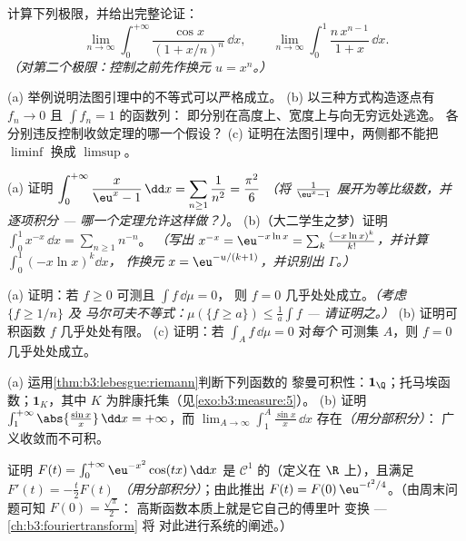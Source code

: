 \begin{exercise}[$\star$]\label{exo:b3:lebesgue:2}
计算下列极限，并给出完整论证：
\[
\lim_{n\to\infty}\int_0^{+\infty}
\frac{\cos x}{(1 + x/n)^{n}}\,\dd x,
\qquad
\lim_{n\to\infty}\int_0^1 \frac{n\,x^{n-1}}{1 + x}\,\dd x .
\]
\emph{（对第二个极限：控制之前先作换元 $u = x^n$。）}
\end{exercise}

\begin{exercise}[$\star\star$]\label{exo:b3:lebesgue:3}
(a) 举例说明法图引理中的不等式可以严格成立。
(b) 以三种方式构造逐点有 $f_n \to 0$ 且 $\int f_n = 1$ 的函数列：
即分别在高度上、宽度上与向无穷远处逃逸。
各分别违反控制收敛定理的哪一个假设？
(c) 证明在法图引理中，两侧都不能把 $\liminf$ 换成
$\limsup$。
\end{exercise}

\begin{exercise}[$\star\star$]\label{exo:b3:lebesgue:4}
(a) 证明 $\displaystyle\int_0^{+\infty}\frac{x}{\eu^x -
1}\,\dd x = \sum_{n\geq1}\frac1{n^2} = \frac{\pi^2}6$
\emph{（将 $\frac1{\eu^x - 1}$ 展开为等比级数，并
逐项积分 --- 哪一个定理允许这样做？）}。
(b)（大二学生之梦）证明
$\displaystyle\int_0^1 x^{-x}\,\dd x = \sum_{n\geq1}n^{-n}$。
\emph{（写出 $x^{-x} = \eu^{-x\ln x} = \sum_k\frac{(-x\ln
x)^k}{k!}$，并计算 $\int_0^1(-x\ln x)^k\dd x$，
作换元 $x = \eu^{-u/(k+1)}$，并识别出 $\Gamma$。）}
\end{exercise}

\begin{exercise}[$\star\star$]\label{exo:b3:lebesgue:5}
(a) 证明：若 $f \geq 0$ 可测且 $\int f\,\dd\mu = 0$，
则 $f = 0$ 几乎处处成立。\emph{（考虑 $\{f \geq 1/n\}$ 及
马尔可夫不等式：$\mu(\{f \geq a\}) \leq \frac1a\int f$ ---
请证明之。）}
(b) 证明可积函数 $f$ 几乎处处有限。
(c) 证明：若 $\int_A f\,\dd\mu = 0$ 对\emph{每个}
可测集 $A$，则 $f = 0$ 几乎处处成立。
\end{exercise}

\begin{exercise}[$\star\star$]\label{exo:b3:lebesgue:6}
(a) 运用\cref{thm:b3:lebesgue:riemann}判断下列函数的
黎曼可积性：$\mathbf 1_\Q$；托马埃函数；$\mathbf
1_K$，其中 $K$ 为胖康托集（见\cref{exo:b3:measure:5}）。
(b) 证明 $\int_1^{+\infty}\abs{\frac{\sin x}x}\,\dd x =
+\infty$，而 $\lim_{A\to\infty}\int_1^A\frac{\sin
x}x\,\dd x$ 存在\emph{（用分部积分）}：
广义收敛而不可积。
\end{exercise}

\begin{exercise}[$\star\star$]\label{exo:b3:lebesgue:7}
证明 $F(t) = \int_0^{+\infty}\eu^{-x^2}\cos(tx)\,\dd x$
是 $\mathcal C^1$ 的（定义在 $\R$ 上），且满足 $F'(t) = -\frac t2F(t)$
\emph{（用分部积分）}；由此推出 $F(t) =
F(0)\,\eu^{-t^2/4}$。（由周末问题可知 $F(0) = \frac{\sqrt\pi}2$：
高斯函数本质上就是它自己的傅里叶
变换 --- \cref{ch:b3:fouriertransform} 将
对此进行系统的阐述。）
\end{exercise}

